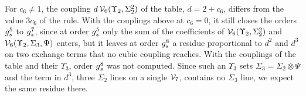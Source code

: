 For $c_6 \neq 1$, the coupling $d \, \mathcal{V}_{6}(\Upsilon_2, \Sigma_2^2)$ of the table, $d = 2 + c_6$, differs from the value $3 c_6$ of the rule.
  With the couplings above at $c_6 = 0$, it still closes the orders $g_s^5$ to $g_s^7$, since at order $g_s^5$ only the sum of the coefficients of $\mathcal{V}_{6}(\Upsilon_2, \Sigma_2^2)$ and $\mathcal{V}_{6}(\Upsilon_2, \Sigma_3, \Psi)$ enters, but it leaves at order $g_s^8$ a residue proportional to $d^2$ and $d^3$ on two exchange terms that no cubic coupling reaches.
  With the couplings of the table and their $\Upsilon_3$, order $g_s^8$ was not computed.
  Since such an $\Upsilon_3$ sets $\Sigma_3 = \Sigma_2 \otimes \Psi$ and the term in $d^3$, three $\Sigma_2$ lines on a single $\mathcal{V}_{7}$, contains no $\Sigma_3$ line, we expect the same residue there.
